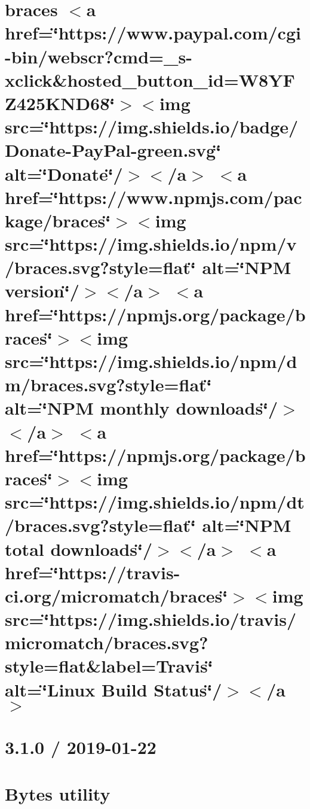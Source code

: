 \let\mypdfximage\pdfximage\def\pdfximage{\immediate\mypdfximage}\documentclass[twoside]{book}
\newcommand{\+}{\discretionary{\mbox{\scriptsize$\hookleftarrow$}}{}{}}
\begin{document}
\chapter{braces $<$a href=\char`\"{}https\+://www.\+paypal.\+com/cgi-\/bin/webscr?cmd=\+\_\+s-\/xclick\&hosted\+\_\+button\+\_\+id=\+W8\+Y\+F\+Z425\+K\+N\+D68\char`\"{}$>$$<$img src=\char`\"{}https\+://img.\+shields.\+io/badge/\+Donate-\/\+Pay\+Pal-\/green.\+svg\char`\"{} alt=\char`\"{}\+Donate\char`\"{}/$>$$<$/a$>$ $<$a href=\char`\"{}https\+://www.\+npmjs.\+com/package/braces\char`\"{}$>$$<$img src=\char`\"{}https\+://img.\+shields.\+io/npm/v/braces.\+svg?style=flat\char`\"{} alt=\char`\"{}\+N\+P\+M version\char`\"{}/$>$$<$/a$>$ $<$a href=\char`\"{}https\+://npmjs.\+org/package/braces\char`\"{}$>$$<$img src=\char`\"{}https\+://img.\+shields.\+io/npm/dm/braces.\+svg?style=flat\char`\"{} alt=\char`\"{}\+N\+P\+M monthly downloads\char`\"{}/$>$$<$/a$>$ $<$a href=\char`\"{}https\+://npmjs.\+org/package/braces\char`\"{}$>$$<$img src=\char`\"{}https\+://img.\+shields.\+io/npm/dt/braces.\+svg?style=flat\char`\"{} alt=\char`\"{}\+N\+P\+M total downloads\char`\"{}/$>$$<$/a$>$ $<$a href=\char`\"{}https\+://travis-\/ci.\+org/micromatch/braces\char`\"{}$>$$<$img src=\char`\"{}https\+://img.\+shields.\+io/travis/micromatch/braces.\+svg?style=flat\&label=\+Travis\char`\"{} alt=\char`\"{}\+Linux Build Status\char`\"{}/$>$$<$/a$>$}
\label{md__c_1__git_hub__p_r_o_y_e_c_t_o-_i_i_i-_g_o_t_rest-api_node_modules_braces__r_e_a_d_m_e}

\chapter{3.1.0 / 2019-\/01-\/22}
\label{md__c_1__git_hub__p_r_o_y_e_c_t_o-_i_i_i-_g_o_t_rest-api_node_modules_bytes__history}

\chapter{Bytes utility}
\label{md__c_1__git_hub__p_r_o_y_e_c_t_o-_i_i_i-_g_o_t_rest-api_node_modules_bytes__readme}

\end{document}
